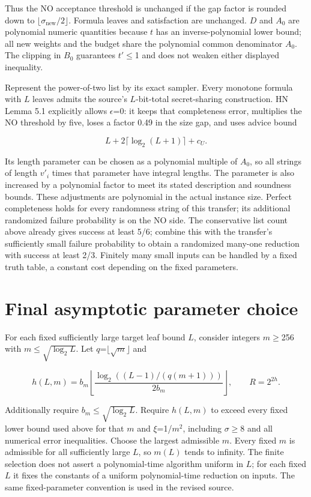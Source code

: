 Thus the NO acceptance threshold is unchanged if the gap factor is rounded down to \(\lfloor \sigma_{\mathrm{new}}/2\rfloor\). Formula leaves and satisfaction are unchanged. \(D\) and \(A_0\) are polynomial numeric quantities because \(t\) has an inverse-polynomial lower bound; all new weights and the budget share the polynomial common denominator \(A_0\). The clipping in \(B_0\) guarantees \(t'\)\(\le\)1 and does not weaken either displayed inequality.

Represent the power-of-two list by its exact sampler. Every monotone formula with \(L\) leaves admits the source's \(L\)-bit-total secret-sharing construction. HN Lemma 5.1 explicitly allows \(\epsilon\)=0: it keeps that completeness error, multiplies the NO threshold by five, loses a factor 0.49 in the size gap, and uses advice bound

\begin{equation}\label{eq:27}
L+2\lceil\log_2(L+1)\rceil+c_U.
\end{equation}

Its length parameter can be chosen as a polynomial multiple of \(A_0\), so all strings of length \(v'_i\) times that parameter have integral lengths. The parameter is also increased by a polynomial factor to meet its stated description and soundness bounds. These adjustments are polynomial in the actual instance size. Perfect completeness holds for every randomness string of this transfer; its additional randomized failure probability is on the NO side. The conservative list count above already gives success at least 5/6; combine this with the transfer's sufficiently small failure probability to obtain a randomized many-one reduction with success at least 2/3. Finitely many small inputs can be handled by a fixed truth table, a constant cost depending on the fixed parameters.

\section{Final asymptotic parameter choice}\label{sec:10}
For each fixed sufficiently large target leaf bound \(L\), consider integers \(m\)\(\ge\)256 with \(m\)\(\le\)\(\sqrt{\log_2 L}\). Let \(q\)=\(\lfloor \sqrt{m}\rfloor\) and

\begin{equation}\label{eq:28}
h(L,m)=b_m\left\lfloor\frac{\log_2((L-1)/(q(m+1)))}{2b_m}\right\rfloor,\qquad R=2^{2h}.
\end{equation}

Additionally require \(b_m\)\(\le\)\(\sqrt{\log_2 L}\). Require \(h(L,m)\) to exceed every fixed lower bound used above for that \(m\) and \(\xi\)=1/\(m^2\), including \(\sigma\)\(\ge\)8 and all numerical error inequalities. Choose the largest admissible \(m\). Every fixed \(m\) is admissible for all sufficiently large \(L\), so \(m(L)\) tends to infinity. The finite selection does not assert a polynomial-time algorithm uniform in \(L\); for each fixed \(L\) it fixes the constants of a uniform polynomial-time reduction on inputs. The same fixed-parameter convention is used in the revised source.

